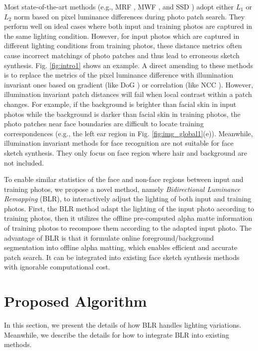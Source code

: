 \documentclass{article}
\begin{document}
Most state-of-the-art methods (e.g., MRF \cite{wang-pami2009-face}, MWF \cite{hao-cvpr12-mwf}, and SSD \cite{song-eccv14-sketch}) adopt either $L_1$ or $L_2$ norm based on pixel luminance differences during photo patch search. They perform well on ideal cases where both input and training photos are captured in the same lighting condition. However, for input photos which are captured in different lighting conditions from training photos, these distance metrics often cause incorrect matchings of photo patches and thus lead to erroneous sketch synthesis. Fig. \ref{fig:intro1} shows an example. A direct amending to these methods is to replace the metrics of the pixel luminance difference with illumination invariant ones based on gradient (like DoG \cite{wei-eccv10-lighting}) or correlation (like NCC \cite{szeliski-10-computer}). However, illumination invariant patch distances will fail when local contrast within a patch changes. For example, if the background is brighter than facial skin in input photos while the background is darker than facial skin in training photos, the photo patches near face boundaries are difficult to locate training correspondences (e.g., the left ear region in Fig. \ref{fig:img_global1}(e)). Meanwhile, illumination invariant methods \cite{han-eccv10-lighting,Xie-cvpr08-FaceNormalization} for face recognition are not suitable for face sketch synthesis. They only focus on face region where hair and background are not included.

To enable similar statistics of the face and non-face regions between input and training photos, we propose a novel method, namely \emph{Bidirectional Luminance Remapping} (BLR), to interactively adjust the lighting of both input and training photos. First, the BLR method adapt the lighting of the input photo according to training photos, then it utilizes the offline pre-computed alpha matte information of training photos to recompose them according to the adapted input photo. The advantage of BLR is that it formulate online foreground/background segmentation into offline alpha matting, which enables efficient and accurate patch search. It can be integrated into existing face sketch synthesis methods with ignorable computational cost.

\section{Proposed Algorithm}

In this section, we present the details of how BLR handles lighting variations. Meanwhile, we describe the details for how to integrate BLR into existing methods.
\end{document}
